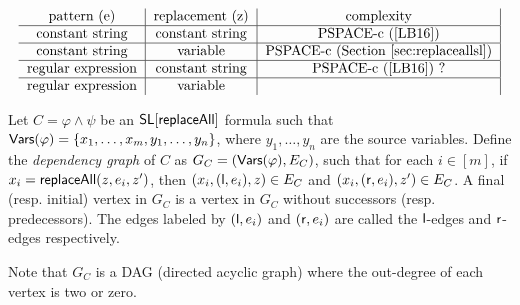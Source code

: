\[
\begin{tabular}{c|c|c|c}
pattern (e)  &   replacement (z)        & complexity \\
\hline
constant string  &   constant   string                    & PSPACE-c (\cite{LB16})     \\
\hline
constant string  &   variable                       & PSPACE-c (Section \ref{sec:replaceallsl})       \\
\hline
regular expression  &   constant string                      &    PSPACE-c (\cite{LB16}) ?     \\
\hline
regular expression  &   variable                       &           \\
\end{tabular}
\]


\begin{definition}
	Let $C= \varphi \wedge \psi$ be an $\mathsf{SL}[\mathsf{replaceAll}]$ formula such that $\mathsf{Vars}(\varphi) = \{x_1,\dots, x_m, y_1, \dots, y_n\}$, where $y_1,\dots, y_n$ are the source variables. Define the \emph{dependency graph} of $C$ as $G_C= (\mathsf{Vars}(\varphi), E_C)$, such that for each $i \in [m]$, if $x_i = \mathsf{replaceAll}(z, e_i, z')$, then $(x_i, (\mathsf{l}, e_i), z) \in E_C$ and $(x_i, (\mathsf{r}, e_i), z') \in E_C$. A final (resp. initial) vertex in $G_C$ is a vertex in $G_C$ without successors (resp. predecessors). The edges labeled by $(\mathsf{l}, e_i)$ and $(\mathsf{r}, e_i)$ are called the $\mathsf{l}$-edges and $\mathsf{r}$-edges respectively. 
\end{definition}
Note that $G_C$ is a DAG (directed acyclic graph) where the out-degree of each vertex is two or zero. 



